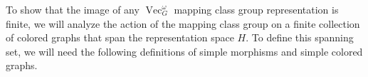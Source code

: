 \documentclass{ws-jktr}
\newtheorem{prop}[thm]{Proposition}
\DeclareMathOperator{\MCG}{MCG}
\DeclareMathOperator{\Vect}{Vec}
\DeclareMathOperator{\Homeo}{Homeo}
\DeclareMathOperator{\Hom}{Hom}
\DeclareMathOperator{\ev}{ev}
\newcommand{\one}{1}
\begin{document}




\newcommand{\B}{\mathcal B}





To show that the image of any $\Vect_G^\omega$ mapping class group representation is finite, we will analyze the action of the mapping class group on a finite collection of colored graphs that span the representation space $H$.  To define this spanning set, we will need the following definitions of simple morphisms and simple colored graphs.
\end{document}
